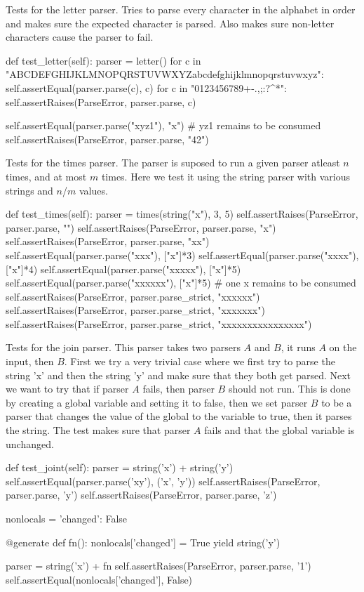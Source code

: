 
Tests for the letter parser. Tries to parse every character in the alphabet in order and makes sure the expected character is parsed.
Also makes sure non-letter characters cause the parser to fail.
\begin{python}
def test_letter(self):
    parser = letter()
    for c in "ABCDEFGHIJKLMNOPQRSTUVWXYZabcdefghijklmnopqrstuvwxyz":
        self.assertEqual(parser.parse(c), c)
    for c in "0123456789+-.,;:?^*":
        self.assertRaises(ParseError, parser.parse, c)

    self.assertEqual(parser.parse("xyz1"), "x") # yz1 remains to be consumed
    self.assertRaises(ParseError, parser.parse, "42")
\end{python}


Tests for the times parser. The parser is suposed to run a given parser atleast $n$ times, and at most $m$ times. Here we test it using the string parser with various strings and $n$/$m$ values.
\begin{python}
def test_times(self):
    parser = times(string("x"), 3, 5)
    self.assertRaises(ParseError, parser.parse, "")
    self.assertRaises(ParseError, parser.parse, "x")
    self.assertRaises(ParseError, parser.parse, "xx")
    self.assertEqual(parser.parse("xxx"), ["x"]*3)
    self.assertEqual(parser.parse("xxxx"), ["x"]*4)
    self.assertEqual(parser.parse("xxxxx"), ["x"]*5)
    self.assertEqual(parser.parse("xxxxxx"), ["x"]*5) # one x remains to be consumed
    self.assertRaises(ParseError, parser.parse_strict, "xxxxxx")
    self.assertRaises(ParseError, parser.parse_strict, "xxxxxxx")
    self.assertRaises(ParseError, parser.parse_strict, "xxxxxxxxxxxxxxxx")
\end{python}


Tests for the join parser. This parser takes two parsers $A$ and $B$, it runs $A$ on the input, then $B$. First we try a very trivial case where we first try to parse the string 'x' and then the string 'y' and make sure that they both get parsed. Next we want to try that if parser $A$ fails, then parser $B$ should not run. This is done by creating a global variable and setting it to false, then we set parser $B$ to be a parser that changes the value of the global to the variable to true, then it parses the string. The test makes sure that parser $A$ fails and that the global variable is unchanged.
\begin{python}
def test_joint(self):
    parser = string('x') + string('y')
    self.assertEqual(parser.parse('xy'), ('x', 'y'))
    self.assertRaises(ParseError, parser.parse, 'y')
    self.assertRaises(ParseError, parser.parse, 'z')

    nonlocals = {'changed': False}

    @generate
    def fn():
        nonlocals['changed'] = True
        yield string('y')

    parser = string('x') + fn
    self.assertRaises(ParseError, parser.parse, '1')
    self.assertEqual(nonlocals['changed'], False)
\end{python}

